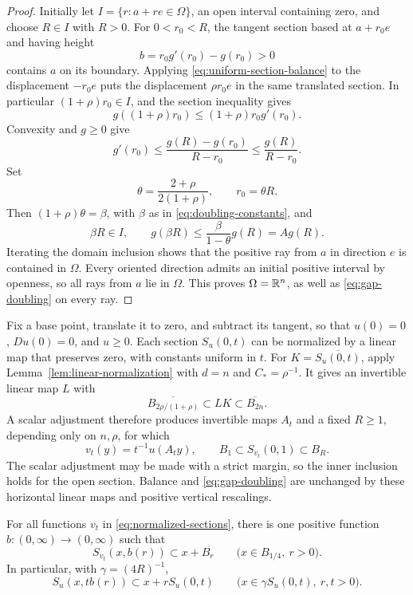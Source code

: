 \begin{proof}
Initially let \(I=\{r:a+re\in\Omega\}\), an open interval containing
zero, and choose \(R\in I\) with \(R>0\).
For \(0<r_0<R\), the tangent section based at \(a+r_0e\) and having
height
\[
 b=r_0g'(r_0)-g(r_0)>0
\]
contains \(a\) on its boundary.  Applying
\eqref{eq:uniform-section-balance} to the displacement \(-r_0e\)
puts the displacement \(\rho r_0e\) in the same translated section.
In particular \((1+\rho)r_0\in I\), and the section inequality gives
\[
 g((1+\rho)r_0)\le(1+\rho)r_0g'(r_0).
\]
Convexity and \(g\ge0\) give
\[
 g'(r_0)\le
 \frac{g(R)-g(r_0)}{R-r_0}
 \le\frac{g(R)}{R-r_0}.
\]
Set
\[
 \theta=\frac{2+\rho}{2(1+\rho)},\qquad r_0=\theta R.
\]
Then \((1+\rho)\theta=\beta\), with \(\beta\) as in
\eqref{eq:doubling-constants}, and
\[
 \beta R\in I,\qquad
 g(\beta R)\le\frac{\beta}{1-\theta}g(R)=A g(R).
\]
Iterating the domain inclusion shows that the positive ray from \(a\)
in direction \(e\) is contained in \(\Omega\).
Every oriented direction admits an initial positive interval by
openness, so all rays from \(a\) lie in \(\Omega\).  This proves
\(\Omega=\mathbb R^n\), as well as \eqref{eq:gap-doubling} on every ray.
\end{proof}

Fix a base point, translate it to zero, and subtract its tangent, so that
\(u(0)=0\), \(Du(0)=0\), and \(u\ge0\).  Each section \(S_u(0,t)\)
can be normalized by a linear map that preserves zero, with constants
uniform in \(t\).  For \(K=\overline{S_u(0,t)}\), apply
Lemma~\ref{lem:linear-normalization} with \(d=n\) and
\(C_*=\rho^{-1}\).  It gives an invertible linear map \(L\) with
\[
 \overline{B_{2\rho/(1+\rho)}}\subset LK
 \subset\overline{B_{2n}}.
\]
A scalar adjustment therefore produces invertible maps \(A_t\) and
a fixed \(R\ge1\), depending only on \(n,\rho\), for which
\begin{equation}\label{eq:normalized-sections}
 v_t(y)=t^{-1}u(A_ty),\qquad
 B_1\subset S_{v_t}(0,1)\subset B_R.
\end{equation}
The scalar adjustment may be made with a strict margin, so the inner
inclusion holds for the open section.  Balance and
\eqref{eq:gap-doubling} are unchanged by these horizontal linear
maps and positive vertical rescalings.

\begin{lemma}\label{lem:normalized-modulus}
For all functions \(v_t\) in \eqref{eq:normalized-sections}, there is one
positive function \(b:(0,\infty)\to(0,\infty)\) such that
\begin{equation}\label{eq:normalized-modulus}
 S_{v_t}(x,b(r))\subset x+B_r
 \qquad\bigl(x\in B_{1/4},\ r>0\bigr).
\end{equation}
In particular, with \(\gamma=(4R)^{-1}\),
\begin{equation}\label{eq:uniform-strict-convexity}
 S_u(x,tb(r))\subset x+rS_u(0,t)
 \qquad
 \bigl(x\in\gamma S_u(0,t),\ r,t>0\bigr).
\end{equation}
\end{lemma}

